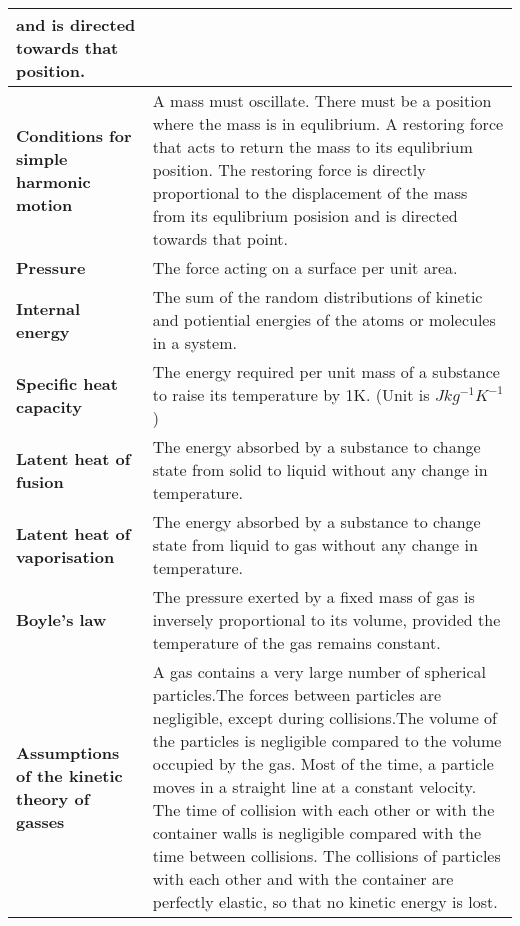 \documentclass{article}
\begin{document}
\begin{longtable}{>{\bf\centering\arraybackslash}p{1in} 
  p{\textwidth-4\tabcolsep-1in}}
    and is directed towards that position.\\ \midrule
  Conditions for simple harmonic motion & A mass must oscillate. \newline
    \newline There must be a position where the mass is in equlibrium.\newline
    \newline A restoring force that acts to return the mass to its equlibrium
    position. The restoring force is directly proportional to the displacement
    of the mass from its equlibrium posision and is directed towards that point.
    \\ %
  Pressure & The force acting on a surface per unit area.\\ \midrule
  Internal energy & The sum of the random distributions of kinetic and
    potiential energies of the atoms or molecules in a system.\\ \midrule
  Specific heat capacity & The energy required per unit mass of a substance to
    raise its temperature by 1K. (Unit is $Jkg^{-1}K^{-1}$)\\ \midrule
  Latent heat of fusion & The energy absorbed by a substance to change state
    from solid to liquid without any change in temperature. \\ \midrule
  Latent heat of vaporisation & The energy absorbed by a substance to change
    state from liquid to gas without any change in temperature. \\ \midrule
  Boyle's law & The pressure exerted by a fixed mass of gas is inversely
    proportional to its volume, provided the temperature of the gas remains
    constant.\\ \midrule
  Assumptions of the kinetic theory of gasses & A gas contains a very large
    number of spherical particles.\newline \newline The forces between particles
    are negligible, except during collisions.\newline \newline The volume of the
    particles is negligible compared to the volume occupied by the gas.\newline
    \newline Most of the time, a particle moves in a straight line at a constant
    velocity. The time of collision with each other or with the container walls
    is negligible compared with the time between collisions.\newline \newline
    The collisions of particles with each other and with the container are 
    perfectly elastic, so that no kinetic energy is lost.\\ \midrule
\end{longtable}
\end{document}
